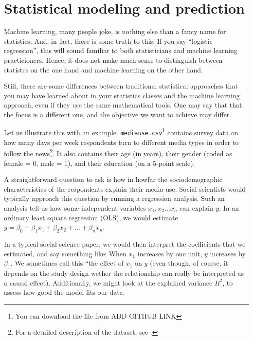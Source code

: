 \section{Statistical modeling and prediction}
\label{sec:prediction}
Machine learning, many people joke, is nothing else than a fancy name for statistics.
And, in fact, there is some truth to this:
If you say ``logistic regression'', this will sound familiar to both statisticians
and machine learning practicioners.
Hence, it does not make much sense to distinguish between statistcs on the one hand
and machine learning on the other hand.

Still, there are some differences between traditional statistical approaches that
you may have learned about in your statistics classes and the machine learning
approach, even if they use the same mathematical tools. One may say that that the
focus is a different one, and the objective we want to achieve may differ.

Let us illustrate this with an example.
\texttt{mediause.csv}\footnote{You can download the file from ADD GITHUB LINK}
contains survey data on how many days per week respondents turn to different media
types in order to follow the news\footnote{For a detailed description of the
dataset, see \citet{Trilling2013phd}.}. It also contains their
age (in years), their gender (coded as female = 0, male = 1), and their education
(on a 5-point scale).

A straightforward question to ask is how in howfar the sociodemographic
characteristics of the respondents explain their media use.
Social scientists would typically approach this question by running a regression
analysis.
Such an analysis tell us how some independent variables $x_1, x_2 \ldots x_n$
can explain $y$.
In an ordinary least square regression (OLS), we would estimate
$y=\beta_0 + \beta_1 x_1 + \beta_2 x_2 + \ldots + \beta_n x_n$.

In a typical social-science paper, we would then interpret the coefficients
that we estimated, and say something like: When $x_1$ increases by one unit,
$y$ increases by $\beta_1$.
We sometimes call this ``the effect of $x_1$ on $y$ (even though, of course,
it depends on the study design wether the relationship can really be interpreted
as a causal effect).
Additionally, we might look at the explained variance $R^2$, to assess how good
the model fits our data.


